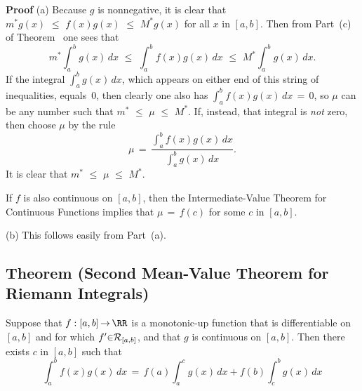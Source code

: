         {\bf Proof} (a) Because $g$ is nonnegative, it is clear that $m^{{\ast}}g(x)\,\,{\leq}\,\,f(x)g(x)\,\,{\leq}\,\,M^{{\ast}}g(x)$ for all $x$ in $[a,b]$.
    Then from Part~(c) of Theorem~ one sees that
        \begin{displaymath}
        m^{{\ast}}\int_{a}^{b} g(x)\,dx\,\,{\leq}\,\,\int_{a}^{b} f(x)g(x)\,dx\,\,{\leq}\,\, M^{{\ast}}\int_{a}^{b} g(x)\,dx.
        \end{displaymath}
    If the integral ${\displaystyle \int_{a}^{b} g(x)\,dx}$, which appears on either end of this string of inequalities, equals~$0$, then clearly one also has ${\displaystyle \int_{a}^{b} f(x)g(x)\,dx \,=\, 0}$, so ${\mu}$ can be any number such that $m^{{\ast}}\,\,{\leq}\,\,{\mu}\,\,{\leq}\,\,M^{{\ast}}$.
    If, instead, that integral is {\em not} zero, then choose ${\mu}$ by the rule
        \begin{displaymath}
        {\mu} \,=\, \frac{{\displaystyle \int_{a}^{b} f(x)g(x)\,dx}}{{\displaystyle \int_{a}^{b} g(x)\,dx}}.
        \end{displaymath}
    It is clear that $m^{{\ast}}\,\,{\leq}\,\,{\mu}\,\,{\leq}\,\,M^{{\ast}}$.

        If $f$ is also continuous on $[a,b]$, then the Intermediate-Value Theorem for Continuous Functions implies that ${\mu} \,=\, f(c)$ for some $c$ in $[a,b]$.

\V

        (b) This follows easily from Part~(a).

\V
\V


        \subsection{\small{{\bf Theorem} (Second Mean-Value Theorem for Riemann Integrals)}}
        \label{ThmH50.40}

\V

        Suppose that $f:[a,b] \,{\rightarrow}\, {\RR}$ is a monotonic-up function that is differentiable on $[a,b]$ and for which $f'{\in}{\cal R}_{[a,b]}$, and that $g$ is continuous on $[a,b]$.
    Then there exists $c$ in $[a,b]$ such that
        \begin{displaymath}
        \int_{a}^{b} f(x)g(x)\,dx \,=\, f(a)\int_{a}^{c} g(x)\,dx + f(b)\int_{c}^{b} g(x)\,dx
        \end{displaymath}

\V

